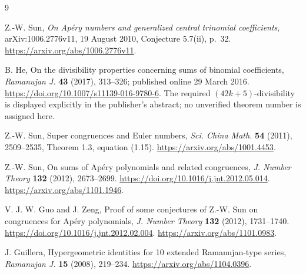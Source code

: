 \documentclass[11pt,a4paper]{article}
\numberwithin{equation}{section}
\theoremstyle{remark}
\begin{document}
\begin{thebibliography}{9}

Z.-W. Sun,
\emph{On Ap\'ery numbers and generalized central trinomial coefficients},
arXiv:1006.2776v11, 19 August 2010,
Conjecture 5.7(ii), p.~32.
\url{https://arxiv.org/abs/1006.2776v11}.

B. He,
On the divisibility properties concerning sums of binomial coefficients,
\emph{Ramanujan J.} \textbf{43} (2017), 313--326;
published online 29 March 2016.
\url{https://doi.org/10.1007/s11139-016-9780-6}.
The required \((42k+5)\)-divisibility is displayed explicitly in the
publisher's abstract; no unverified theorem number is assigned here.

Z.-W. Sun,
Super congruences and Euler numbers,
\emph{Sci. China Math.} \textbf{54} (2011), 2509--2535,
Theorem 1.3, equation (1.15).
\url{https://arxiv.org/abs/1001.4453}.

Z.-W. Sun,
On sums of Ap\'ery polynomials and related congruences,
\emph{J. Number Theory} \textbf{132} (2012), 2673--2699.
\url{https://doi.org/10.1016/j.jnt.2012.05.014}.
\url{https://arxiv.org/abs/1101.1946}.

V. J. W. Guo and J. Zeng,
Proof of some conjectures of Z.-W. Sun on congruences for Ap\'ery polynomials,
\emph{J. Number Theory} \textbf{132} (2012), 1731--1740.
\url{https://doi.org/10.1016/j.jnt.2012.02.004}.
\url{https://arxiv.org/abs/1101.0983}.

J. Guillera,
Hypergeometric identities for 10 extended Ramanujan-type series,
\emph{Ramanujan J.} \textbf{15} (2008), 219--234.
\url{https://arxiv.org/abs/1104.0396}.

\end{thebibliography}
\end{document}
